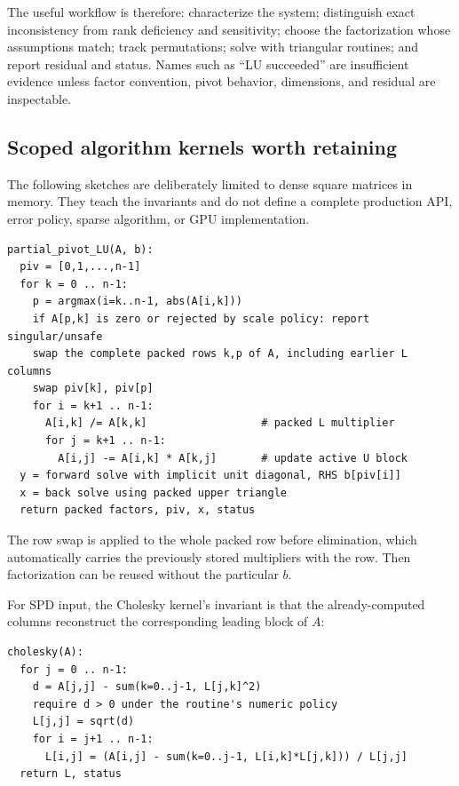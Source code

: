 The useful workflow is therefore: characterize the system; distinguish exact inconsistency from rank deficiency and sensitivity; choose the factorization whose assumptions match; track permutations; solve with triangular routines; and report residual and status. Names such as ``LU succeeded'' are insufficient evidence unless factor convention, pivot behavior, dimensions, and residual are inspectable.

\subsection{Scoped algorithm kernels worth retaining}\label{01-foundations-i-ch020-scoped-algorithm-kernels-worth-retaining}

\hypertarget{01-foundations-i-ch020-scoped-algorithm-kernels-worth-retaining}{}

The following sketches are deliberately limited to dense square matrices in memory. They teach the invariants and do not define a complete production API, error policy, sparse algorithm, or GPU implementation.

\begin{verbatim}
partial_pivot_LU(A, b):
  piv = [0,1,...,n-1]
  for k = 0 .. n-1:
    p = argmax(i=k..n-1, abs(A[i,k]))
    if A[p,k] is zero or rejected by scale policy: report singular/unsafe
    swap the complete packed rows k,p of A, including earlier L columns
    swap piv[k], piv[p]
    for i = k+1 .. n-1:
      A[i,k] /= A[k,k]                  # packed L multiplier
      for j = k+1 .. n-1:
        A[i,j] -= A[i,k] * A[k,j]       # update active U block
  y = forward solve with implicit unit diagonal, RHS b[piv[i]]
  x = back solve using packed upper triangle
  return packed factors, piv, x, status
\end{verbatim}

The row swap is applied to the whole packed row before elimination, which automatically carries the previously stored multipliers with the row. Then factorization can be reused without the particular \(b\).

For SPD input, the Cholesky kernel's invariant is that the already-computed columns reconstruct the corresponding leading block of \(A\):

\begin{verbatim}
cholesky(A):
  for j = 0 .. n-1:
    d = A[j,j] - sum(k=0..j-1, L[j,k]^2)
    require d > 0 under the routine's numeric policy
    L[j,j] = sqrt(d)
    for i = j+1 .. n-1:
      L[i,j] = (A[i,j] - sum(k=0..j-1, L[i,k]*L[j,k])) / L[j,j]
  return L, status
\end{verbatim}

